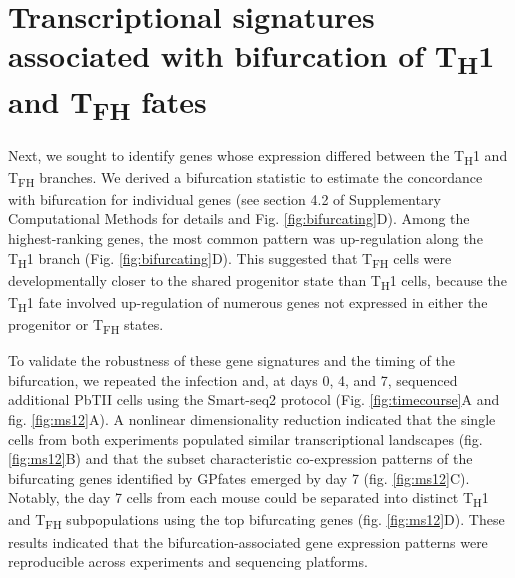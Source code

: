 \section{Transcriptional signatures associated with bifurcation of \texorpdfstring{T\textsubscript{H}1 and T\textsubscript{FH}}{TH1 and TFH} fates}

Next, we sought to identify genes whose expression differed between the T\textsubscript{H}1 and T\textsubscript{FH} branches. We derived a bifurcation statistic to estimate the concordance with bifurcation for individual genes (see section 4.2 of Supplementary Computational Methods for details and Fig. \ref{fig:bifurcating}D). Among the highest-ranking genes, the most common pattern was up-regulation along the T\textsubscript{H}1 branch (Fig. \ref{fig:bifurcating}D). This suggested that T\textsubscript{FH} cells were developmentally closer to the shared progenitor state than T\textsubscript{H}1 cells, because the T\textsubscript{H}1 fate involved up-regulation of numerous genes not expressed in either the progenitor or T\textsubscript{FH} states.

To validate the robustness of these gene signatures and the timing of the bifurcation, we repeated the infection and, at days 0, 4, and 7, sequenced additional PbTII cells using the Smart-seq2 protocol (Fig. \ref{fig:timecourse}A and fig. \ref{fig:ms12}A). A nonlinear dimensionality reduction indicated that the single cells from both experiments populated similar transcriptional landscapes (fig. \ref{fig:ms12}B) and that the subset characteristic co-expression patterns of the bifurcating genes identified by GPfates emerged by day 7 (fig. \ref{fig:ms12}C). Notably, the day 7 cells from each mouse could be separated into distinct T\textsubscript{H}1 and T\textsubscript{FH} subpopulations using the top bifurcating genes (fig. \ref{fig:ms12}D). These results indicated that the bifurcation-associated gene expression patterns were reproducible across experiments and sequencing platforms.


